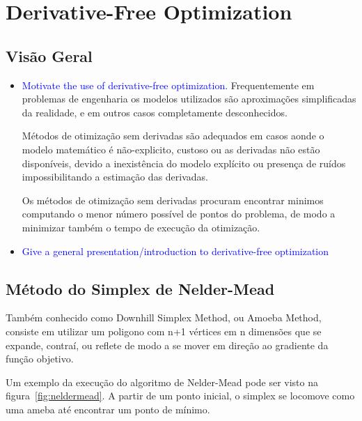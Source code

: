 \chapter{Derivative-Free Optimization} \label{chap:3}


\section{Visão Geral}

\begin{itemize}


\item \textcolor{blue}{Motivate the use of derivative-free optimization.}
Frequentemente em problemas de engenharia os modelos utilizados são aproximações simplificadas da realidade, e em outros casos completamente desconhecidos.

Métodos de otimização sem derivadas são adequados em casos aonde o modelo matemático é não-explicito, custoso ou as derivadas não estão disponíveis, devido a inexistência do modelo explícito ou presença de ruídos impossibilitando a estimação das derivadas.

Os métodos de otimização sem derivadas procuram encontrar minimos computando o menor número possível de pontos do problema, de modo a minimizar também o tempo de execução da otimização.



\item \textcolor{blue}{Give a general presentation/introduction to derivative-free optimization}

\end{itemize}


\section{Método do Simplex de Nelder-Mead}

Também conhecido como Downhill Simplex Method, ou Amoeba Method, consiste em utilizar um poligono com n+1 vértices em n dimensões que se expande, contraí, ou reflete de modo a se mover em direção ao gradiente da função objetivo.

Um exemplo da execução do algoritmo de Nelder-Mead pode ser visto na figura~\ref{fig:neldermead}. A partir de um ponto inicial, o simplex se locomove como uma ameba até encontrar um ponto de mínimo.

